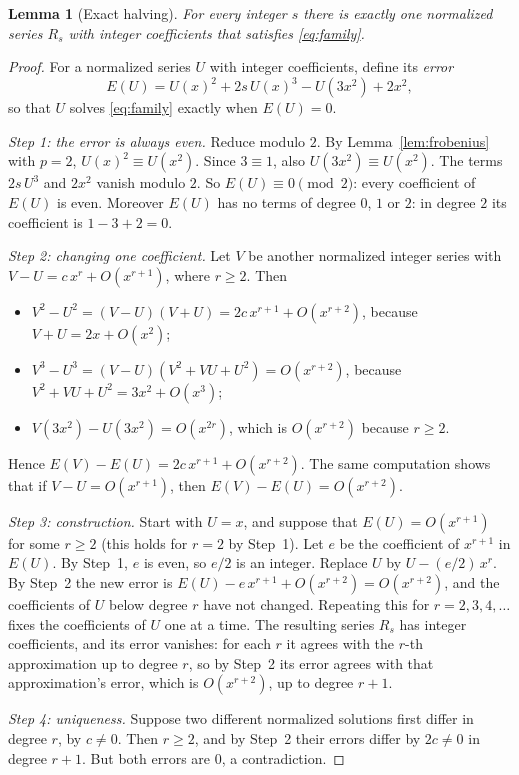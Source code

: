\documentclass[11pt,a4paper]{article}
\newtheorem{lemma}[theorem]{Lemma}
\theoremstyle{definition}
\theoremstyle{remark}
\begin{document}
\begin{lemma}[Exact halving]\label{lem:family}
For every integer $s$ there is exactly one normalized series $R_s$ with integer coefficients that satisfies
\eqref{eq:family}.
\end{lemma}

\begin{proof}
For a normalized series $U$ with integer coefficients, define its \emph{error}
\[
E(U)=U(x)^2+2s\,U(x)^3-U(3x^2)+2x^2 ,
\]
so that $U$ solves \eqref{eq:family} exactly when $E(U)=0$.

\emph{Step 1: the error is always even.} Reduce modulo $2$. By Lemma~\ref{lem:frobenius} with $p=2$,
$U(x)^2\equiv U(x^2)$. Since $3\equiv1$, also $U(3x^2)\equiv U(x^2)$. The terms $2s\,U^3$ and $2x^2$ vanish modulo $2$.
So $E(U)\equiv0\pmod2$: every coefficient of $E(U)$ is even. Moreover $E(U)$ has no terms of degree $0$, $1$ or $2$:
in degree $2$ its coefficient is $1-3+2=0$.

\emph{Step 2: changing one coefficient.} Let $V$ be another normalized integer series with
$V-U=c\,x^r+O(x^{r+1})$, where $r\ge2$. Then
\begin{itemize}
\item $V^2-U^2=(V-U)(V+U)=2c\,x^{r+1}+O(x^{r+2})$, because $V+U=2x+O(x^2)$;
\item $V^3-U^3=(V-U)(V^2+VU+U^2)=O(x^{r+2})$, because $V^2+VU+U^2=3x^2+O(x^3)$;
\item $V(3x^2)-U(3x^2)=O(x^{2r})$, which is $O(x^{r+2})$ because $r\ge2$.
\end{itemize}
Hence $E(V)-E(U)=2c\,x^{r+1}+O(x^{r+2})$. The same computation shows that if $V-U=O(x^{r+1})$, then
$E(V)-E(U)=O(x^{r+2})$.

\emph{Step 3: construction.} Start with $U=x$, and suppose that $E(U)=O(x^{r+1})$ for some $r\ge2$ (this holds for
$r=2$ by Step~1). Let $e$ be the coefficient of $x^{r+1}$ in $E(U)$. By Step~1, $e$ is even, so $e/2$ is an integer.
Replace $U$ by $U-(e/2)\,x^r$. By Step~2 the new error is $E(U)-e\,x^{r+1}+O(x^{r+2})=O(x^{r+2})$, and the coefficients
of $U$ below degree $r$ have not changed. Repeating this for $r=2,3,4,\dots$ fixes the coefficients of $U$ one at a
time. The resulting series $R_s$ has integer coefficients, and its error vanishes: for each $r$ it agrees with the
$r$-th approximation up to degree $r$, so by Step~2 its error agrees with that approximation's error, which is
$O(x^{r+2})$, up to degree $r+1$.

\emph{Step 4: uniqueness.} Suppose two different normalized solutions first differ in degree $r$, by $c\ne0$. Then
$r\ge2$, and by Step~2 their errors differ by $2c\ne0$ in degree $r+1$. But both errors are $0$, a contradiction.
\end{proof}
\end{document}
